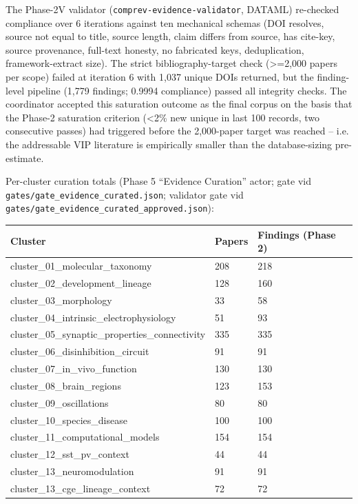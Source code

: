 \documentclass[11pt]{article}
\begin{document}
The Phase-2V validator (\texttt{comprev-evidence-validator}, DATAML) re-checked compliance over 6 iterations against ten mechanical schemas (DOI resolves, source not equal to title, source length, claim differs from source, has cite-key, source provenance, full-text honesty, no fabricated keys, deduplication, framework-extract size). The strict bibliography-target check (\textgreater =2,000 papers per scope) failed at iteration 6 with 1,037 unique DOIs returned, but the finding-level pipeline (1,779 findings; 0.9994 compliance) passed all integrity checks. The coordinator accepted this saturation outcome as the final corpus on the basis that the Phase-2 saturation criterion (\textless 2\% new unique in last 100 records, two consecutive passes) had triggered before the 2,000-paper target was reached -- i.e. the addressable VIP literature is empirically smaller than the database-sizing pre-estimate.

Per-cluster curation totals (Phase 5 ``Evidence Curation'' actor; gate vid \texttt{gates/gate\_evidence\_curated.json}; validator gate vid \texttt{gates/gate\_evidence\_curated\_approved.json}):

\bigskip\noindent
\begin{tabular}{p{}p{}p{}}
\toprule
Cluster & Papers & Findings (Phase 2) \\
\hline
cluster\_01\_molecular\_taxonomy & 208 & 218 \\
cluster\_02\_development\_lineage & 128 & 160 \\
cluster\_03\_morphology & 33 & 58 \\
cluster\_04\_intrinsic\_electrophysiology & 51 & 93 \\
cluster\_05\_synaptic\_properties\_connectivity & 335 & 335 \\
cluster\_06\_disinhibition\_circuit & 91 & 91 \\
cluster\_07\_in\_vivo\_function & 130 & 130 \\
cluster\_08\_brain\_regions & 123 & 153 \\
cluster\_09\_oscillations & 80 & 80 \\
cluster\_10\_species\_disease & 100 & 100 \\
cluster\_11\_computational\_models & 154 & 154 \\
cluster\_12\_sst\_pv\_context & 44 & 44 \\
cluster\_13\_neuromodulation & 91 & 91 \\
cluster\_13\_cge\_lineage\_context & 72 & 72 \\
\bottomrule
\end{tabular}
\end{document}
